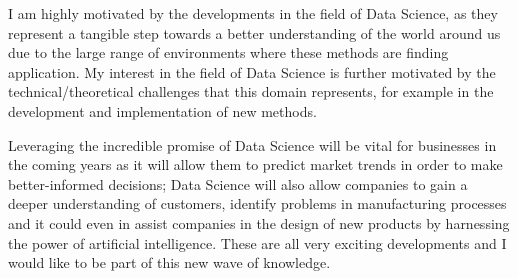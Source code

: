 \documentclass[11pt, a4paper]{awesome-cv}
\begin{document}
\begin{cvletter}
I am highly motivated by the developments in the field of Data Science, as they represent a tangible step towards a better understanding of the world around us due to the large range of environments where these methods are finding application. My interest in the field of Data Science is further motivated by the technical/theoretical challenges that this domain represents, for example in the development and implementation of new methods. 

Leveraging the incredible promise of Data Science will be vital for businesses in the coming years as it will allow them to predict market trends in order to make better-informed decisions; Data Science will also allow companies to gain a deeper understanding of customers, identify problems in manufacturing processes and it could even in assist companies in the design of new products by harnessing the power of artificial intelligence. These are all very exciting developments and I would like to be part of this new wave of knowledge. 

\end{cvletter}

\makeletterclosing
\end{document}
